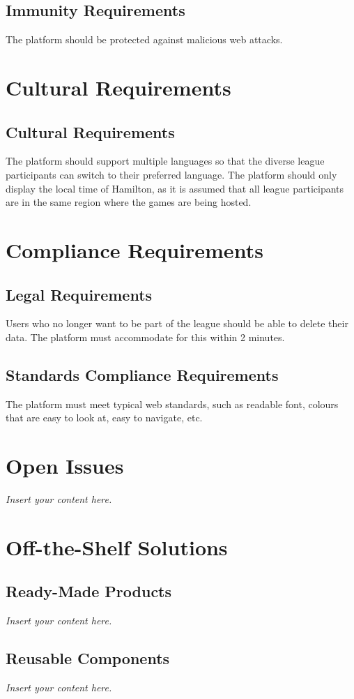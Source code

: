 \documentclass[12pt]{article}
\newcommand{\lips}{\textit{Insert your content here.}}
\begin{document}
\subsection{Immunity Requirements}
The platform should be protected against malicious web attacks.

\section{Cultural Requirements}
\subsection{Cultural Requirements}
The platform should support multiple languages so that the diverse league participants can switch to their preferred language. The platform should only display the local time of Hamilton, as it is assumed that all league participants are in the same region where the games are being hosted.

\section{Compliance Requirements}
\subsection{Legal Requirements}
Users who no longer want to be part of the league should be able to delete their data. The platform must accommodate for this within 2 minutes.

\subsection{Standards Compliance Requirements}
The platform must meet typical web standards, such as readable font, colours that are easy to look at, easy to navigate, etc.

\section{Open Issues}
\lips

\section{Off-the-Shelf Solutions}
\subsection{Ready-Made Products}
\lips
\subsection{Reusable Components}
\lips
\end{document}
